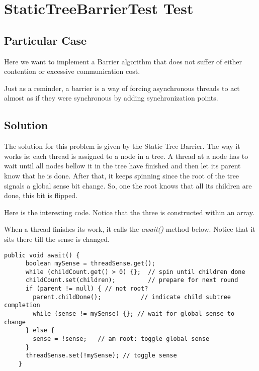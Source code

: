 \section{\textbf{StaticTreeBarrierTest Test}}
\subsection{Particular Case}
\par
Here we want to implement a Barrier algorithm that does not suffer of either
contention or excessive communication cost. 
\par
Just as a reminder, a barrier is a way of forcing asynchronous threads to act
almost as if they were synchronous by adding synchronization points.
\par
\subsection{Solution}
\par
The solution for this problem is given by the Static Tree Barrier. The way it
works is: each thread is assigned to a node in a tree. A thread at a node has to
wait until all nodes bellow it in the tree have finished and then let its parent
know that he is done. After that, it keeps spinning since the root of the tree
signals a global sense bit change. So, one the root knows that all its children
are done, this bit is flipped.
\par
Here is the interesting code. Notice that the three is constructed within an
array.
\par
When a thread finishes its work, it calls the \textit{await()} method below. Notice
that it sits there till the sense is changed.
\par
\hfill
\begin{lstlisting}[style=numbers]
    public void await() {
      boolean mySense = threadSense.get();
      while (childCount.get() > 0) {};  // spin until children done
      childCount.set(children);         // prepare for next round
      if (parent != null) { // not root?
        parent.childDone();           // indicate child subtree completion
        while (sense != mySense) {}; // wait for global sense to change
      } else {
        sense = !sense;   // am root: toggle global sense
      }
      threadSense.set(!mySense); // toggle sense
    }
\end{lstlisting}
\hfill
\par
